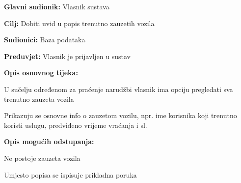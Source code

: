 					\noindent {}
					\begin{packed_item}
	
						\item \textbf{Glavni sudionik: }Vlasnik sustava
						\item  \textbf{Cilj: }Dobiti uvid u popis trenutno zauzetih vozila
						\item  \textbf{Sudionici: }Baza podataka
						\item  \textbf{Preduvjet: }Vlasnik je prijavljen u sustav
						\item  \textbf{Opis osnovnog tijeka:}
						
						\item[] \begin{packed_enum}
							\item U sučelju određenom za praćenje narudžbi vlasnik ima opciju pregledati sva trenutno zauzeta vozila
							\item Prikazuju se osnovne info o zauzetom vozilu, npr. ime korisnika koji trenutno koristi uslugu, predviđeno vrijeme vraćanja i sl.
						\end{packed_enum}
						
						\item  \textbf{Opis mogućih odstupanja:}
						
						\item[] \begin{packed_item}
	
							\item[2.a] Ne postoje zauzeta vozila
							\item[] \begin{packed_enum}
								\item Umjesto popisa se ispisuje prikladna poruka
							\end{packed_enum}
						\end{packed_item}
					\end{packed_item}
					
